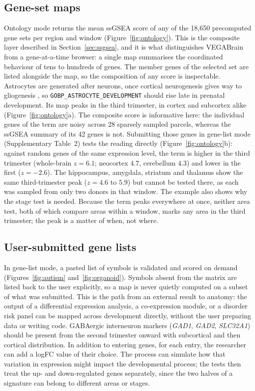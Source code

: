 \documentclass[pdflatex,sn-basic]{sn-jnl}
\begin{document}
\subsection{Gene-set maps}

Ontology mode returns the mean ssGSEA score of any of the 18{,}650 precomputed
gene sets per region and window (Figure~\ref{fig:ontology}). This is the
composite layer described in Section~\ref{sec:ssgsea}, and it is what
distinguishes VEGABrain from a gene-at-a-time browser: a single map summarises
the coordinated behaviour of tens to hundreds of genes. The member genes of the
selected set are listed alongside the map, so the composition of any score is
inspectable. Astrocytes are generated after neurons, once cortical neurogenesis
gives way to gliogenesis \citep{Rowitch2010}, so
\texttt{GOBP\_ASTROCYTE\_DEVELOPMENT} should rise late in prenatal development.
Its map peaks in the third trimester, in cortex and subcortex alike
(Figure~\ref{fig:ontology}a). The composite score is informative here: the
individual genes of the term are noisy across 28 sparsely sampled parcels,
whereas the ssGSEA summary of its 42 genes is not. Submitting those genes in
gene-list mode (Supplementary Table~2) tests the reading directly (Figure~\ref{fig:ontology}b): against
random genes of the same expression level, the term is higher in the third
trimester (whole-brain $z = 6.1$; neocortex $4.7$, cerebellum $4.3$) and lower in
the first ($z = -2.6$). The hippocampus, amygdala, striatum and thalamus show the
same third-trimester peak ($z = 4.6$ to $5.9$) but cannot be tested there, as
each was sampled from only two donors in that window. The example also shows why
the stage test is needed. Because the term peaks everywhere at once, neither
area test, both of which compare areas within a window, marks any area in the
third trimester; the peak is a matter of when, not where.

\subsection{User-submitted gene lists}

In gene-list mode, a pasted list of symbols is validated and scored on demand
(Figures~\ref{fig:autism} and~\ref{fig:organoid}). Symbols absent from the matrix are listed back to
the user explicitly, so a map is never quietly computed on a subset of what was
submitted. This is the path from an external result to anatomy: the output of a
differential expression analysis, a co-expression module, or a disorder risk
panel can be mapped across development directly, without the user preparing
data or writing code. GABAergic interneuron markers (\emph{GAD1}, \emph{GAD2},
\emph{SLC32A1}) should be present from the second trimester onward with
subcortical and then cortical distribution. In addition to entering genes,
for each entry, the researcher can add a logFC value of their choice. The process can simulate 
how that variation in expression might impact the developmental process; the
tests then treat the up- and down-regulated genes separately, since the two
halves of a signature can belong to different areas or stages.
\end{document}
